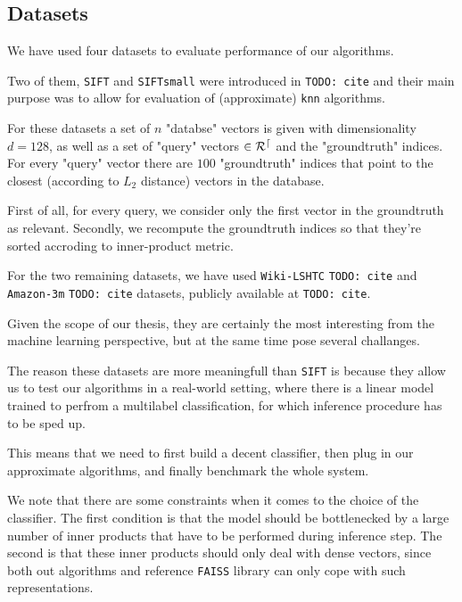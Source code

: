     \subsection{Datasets}\label{sec:datasets}

        We have used four datasets to evaluate performance of our algorithms.

        Two of them, \texttt{SIFT} and \texttt{SIFTsmall} were introduced in \texttt{TODO: cite} and their
        main purpose was to allow for evaluation of (approximate) \texttt{knn} algorithms.

        For these datasets a set of $n$ "databse" vectors is given with dimensionality
        $d=128$, as well as a set of "query" vectors $\in \cal{R}^d$
        and the "groundtruth" indices. For every "query" vector there are $100$ "groundtruth" indices
        that point to the closest (according to $L_2$ distance) vectors in the database.

        First of all, for every query, we consider only the first vector in the groundtruth as relevant.
        Secondly, we recompute the groundtruth indices so that they're sorted accroding to inner-product
        metric.

        For the two remaining datasets, we have used \texttt{Wiki-LSHTC} \texttt{TODO: cite} and \texttt{Amazon-3m}
        \texttt{TODO: cite} datasets, publicly available at \texttt{TODO: cite}.

        Given the scope of our thesis, they are certainly the most interesting from the machine learning perspective,
        but at the same time pose several challanges.

        The reason these datasets are more meaningfull than \texttt{SIFT} is because they allow us to test our
        algorithms in a real-world setting, where there is a linear model trained to perfrom a multilabel
        classification, for which inference procedure has to be sped up.

        This means that we need to first build a decent classifier, then plug in our approximate algorithms,
        and finally benchmark the whole system.

        We note that there are some constraints when it comes to the choice of the classifier. The first condition
        is that the model should be bottlenecked by a large number of inner products that have to be performed during
        inference step. The second is that these inner products should only deal with dense vectors, since both
        out algorithms and reference \texttt{FAISS} library can only cope with such representations.

